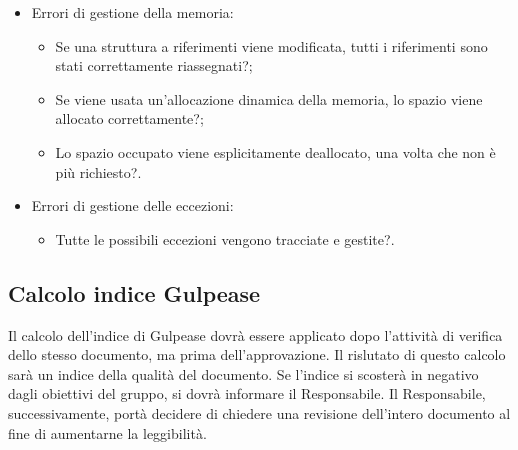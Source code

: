 \begin{itemize}
\item Errori di gestione della memoria:
\begin{itemize}
\item Se una struttura a riferimenti viene modificata, tutti i riferimenti sono stati correttamente riassegnati?;
\item Se viene usata un'allocazione dinamica della memoria, lo spazio viene allocato correttamente?;
\item Lo spazio occupato viene esplicitamente deallocato, una volta che non è più richiesto?.
\end{itemize}
\item Errori di gestione delle eccezioni:
\begin{itemize}
\item Tutte le possibili eccezioni vengono tracciate e gestite?.
\end{itemize}
\end{itemize}

\subsection{Calcolo indice Gulpease}
Il calcolo dell'indice di Gulpease dovrà essere applicato dopo l'attività di verifica dello stesso documento, ma prima dell'approvazione. Il rislutato di questo calcolo sarà un indice della qualità del documento. Se l'indice si scosterà in negativo dagli obiettivi del gruppo, si dovrà informare il Responsabile. Il Responsabile, successivamente, portà decidere di chiedere una revisione dell'intero documento al fine di aumentarne la leggibilità.


